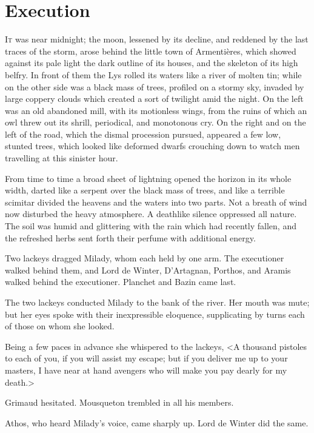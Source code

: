 
\chapter{Execution}

\lettrine{I}{t} was near midnight; the moon, lessened by its decline, and reddened by the last traces of the storm, arose behind the little town of Armentières, which showed against its pale light the dark outline of its houses, and the skeleton of its high belfry. In front of them the Lys rolled its waters like a river of molten tin; while on the other side was a black mass of trees, profiled on a stormy sky, invaded by large coppery clouds which created a sort of twilight amid the night. On the left was an old abandoned mill, with its motionless wings, from the ruins of which an owl threw out its shrill, periodical, and monotonous cry. On the right and on the left of the road, which the dismal procession pursued, appeared a few low, stunted trees, which looked like deformed dwarfs crouching down to watch men travelling at this sinister hour. 

From time to time a broad sheet of lightning opened the horizon in its whole width, darted like a serpent over the black mass of trees, and like a terrible scimitar divided the heavens and the waters into two parts. Not a breath of wind now disturbed the heavy atmosphere. A deathlike silence oppressed all nature. The soil was humid and glittering with the rain which had recently fallen, and the refreshed herbs sent forth their perfume with additional energy. 

Two lackeys dragged Milady, whom each held by one arm. The executioner walked behind them, and Lord de Winter, D'Artagnan, Porthos, and Aramis walked behind the executioner. Planchet and Bazin came last. 

The two lackeys conducted Milady to the bank of the river. Her mouth was mute; but her eyes spoke with their inexpressible eloquence, supplicating by turns each of those on whom she looked. 

Being a few paces in advance she whispered to the lackeys, <A thousand pistoles to each of you, if you will assist my escape; but if you deliver me up to your masters, I have near at hand avengers who will make you pay dearly for my death.> 

Grimaud hesitated. Mousqueton trembled in all his members. 

Athos, who heard Milady's voice, came sharply up. Lord de Winter did the same. 

